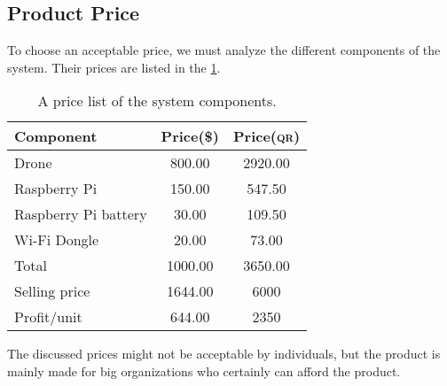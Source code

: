 \documentclass[../main.tex]{subfiles}
\begin{document}
\subsection{Product Price}
To choose an acceptable price, we must analyze the different components of the system. Their prices are listed in the \cref{tab:components-prices}.
	\\
	\begin{table}[tbp]
		\begin{center}
			\caption{A price list of the system components.}
			\label{tab:components-prices}
			\begin{tabular}{p{3.5cm} c c} 
                            \toprule
                            \textbf{Component} & \textbf{Price(\$)} & \textbf{Price(\textsc{qr})}\\
				\midrule
				\anafi Drone & 800.00 & 2920.00 \\
				Raspberry Pi & 150.00 & 547.50 \\
				Raspberry Pi battery & 30.00 & 109.50\\
				Wi-Fi Dongle & 20.00 & 73.00\\
				\hline 
				Total & 1000.00 & 3650.00 \\
				Selling price & 1644.00 & 6000 \\ 
				Profit/unit & 644.00 & 2350 \\
				\bottomrule
			\end{tabular}
		\end{center}
	\end{table}

	The discussed prices might not be acceptable by individuals, but the product is mainly made for big organizations who certainly can afford the product.
	
\end{document}
